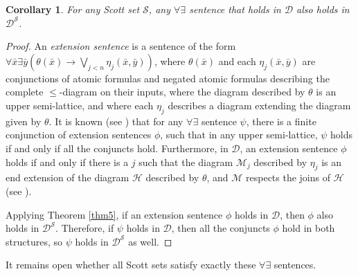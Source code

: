 \documentclass{amsart}
\newtheorem{cor}{Corollary}
\newcommand{\cS}{\mathcal S}
\newcommand{\cDS}{\mathcal D^\cS}
\newcommand{\cH}{\mathcal H}
\newcommand{\cM}{\mathcal M}
\begin{document}
\begin{cor}\label{cor6}
For any Scott set $\cS$,
any $\forall\exists$ sentence that holds in 
$\mathcal D$ also holds in $\cDS$.
\end{cor}
\begin{proof}
An \emph{extension sentence} is a sentence 
of the form $\forall \bar x \exists \bar y 
(\theta(\bar x) \rightarrow \bigvee_{j<n} \eta_j(\bar x, \bar y))$, 
where $\theta(\bar x)$ and each $\eta_j(\bar x , \bar y)$ are
conjunctions of atomic formulas and negated atomic formulas 
describing the complete $\leq$-diagram on their inputs, where
the diagram described by 
$\theta$ is an upper semi-lattice, and where each $\eta_j$ 
describes a diagram extending the diagram given by $\theta$.
It is known (see \cite[Theorem VII.4.4]{lerman}) that for any
$\forall\exists$ sentence $\psi$, there is a finite conjunction of 
extension sentences $\phi$, such that in any upper semi-lattice, 
$\psi$ holds if and only if all the conjuncts hold.
Furthermore, in $\mathcal D$, an extension sentence 
$\phi$ holds if and only if there is a $j$ such that the diagram $\cM_j$
described by $\eta_j$ is an end extension of the diagram $\cH$
described by $\theta$, and $\cM$ respects the joins of $\cH$ 
(see \cite[Theorems II.4.11, VII.4.1]{lerman}).

Applying Theorem \ref{thm5}, 
if an extension sentence $\phi$ holds in $\mathcal D$, 
then $\phi$ also holds in $\cDS$.  
Therefore, if $\psi$ holds in $\mathcal D$, then all the conjuncts 
$\phi$ hold in both structures,
so $\psi$ holds in $\cDS$ as well.
\end{proof}

It remains open whether all Scott sets satisfy exactly these $\forall\exists$ 
sentences.



\end{document}
